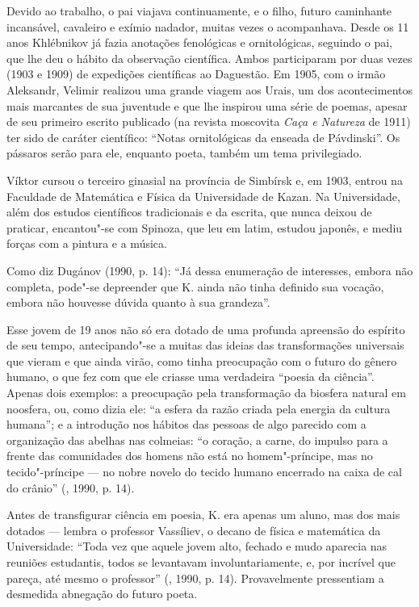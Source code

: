 Devido ao trabalho, o pai viajava continuamente, e o filho, futuro
caminhante incansável, cavaleiro e exímio nadador, muitas vezes o
acompanhava. Desde os 11 anos Khlébnikov já fazia anotações fenológicas e
ornitológicas, seguindo o pai, que lhe deu o hábito da observação
científica. Ambos participaram por duas vezes (1903 e 1909) de
expedições científicas ao Daguestão. Em 1905, com o irmão Aleksandr,
Velimir realizou uma grande viagem aos Urais, um dos acontecimentos mais
marcantes de sua juventude e que lhe inspirou uma série de poemas,
apesar de seu primeiro escrito publicado (na revista moscovita
\emph{Caça e Natureza} de 1911) ter sido de caráter científico: ``Notas
ornitológicas da enseada de Pávdinski''. Os pássaros serão para ele,
enquanto poeta, também um tema privilegiado.

Víktor cursou o terceiro ginasial na província de Simbírsk e, em 1903,
entrou na Faculdade de Matemática e Física da Universidade de Kazan. Na
Universidade, além dos estudos científicos tradicionais e da escrita,
que nunca deixou de praticar, encantou"-se com Spinoza, que leu em latim,
estudou japonês, e mediu forças com a pintura e a música.

Como diz Dugánov (1990, p. 14): ``Já dessa enumeração de interesses, embora não
completa, pode"-se depreender que K. ainda não tinha definido sua
vocação, embora não houvesse dúvida quanto à sua grandeza''.

Esse jovem de 19 anos não só era dotado de uma profunda apreensão do
espírito de seu tempo, antecipando"-se a muitas das ideias das
transformações universais que vieram e que ainda virão, como tinha
preocupação com o futuro do gênero humano, o que fez com que ele criasse
uma verdadeira ``poesia da ciência''. Apenas dois exemplos: a
preocupação pela transformação da biosfera natural em noosfera, ou, como
dizia ele: ``a esfera da razão criada pela energia da cultura humana'';
e a introdução nos hábitos das pessoas de algo parecido com a
organização das abelhas nas colmeias: ``o coração, a carne, do impulso
para a frente das comunidades dos homens não está no homem"-príncipe, mas
no tecido"-príncipe --- no nobre novelo do tecido humano encerrado na
caixa de cal do crânio'' (, 1990, p. 14).

Antes de transfigurar ciência em poesia, K.
era apenas um aluno, mas dos mais dotados --- lembra o professor Vassíliev, o
decano de física e matemática da Universidade: ``Toda vez que aquele
jovem alto, fechado e mudo aparecia nas reuniões estudantis, todos se
levantavam involuntariamente, e, por incrível que pareça, até mesmo o
professor'' (, 1990, p. 14). Provavelmente pressentiam a desmedida abnegação do futuro
poeta.

